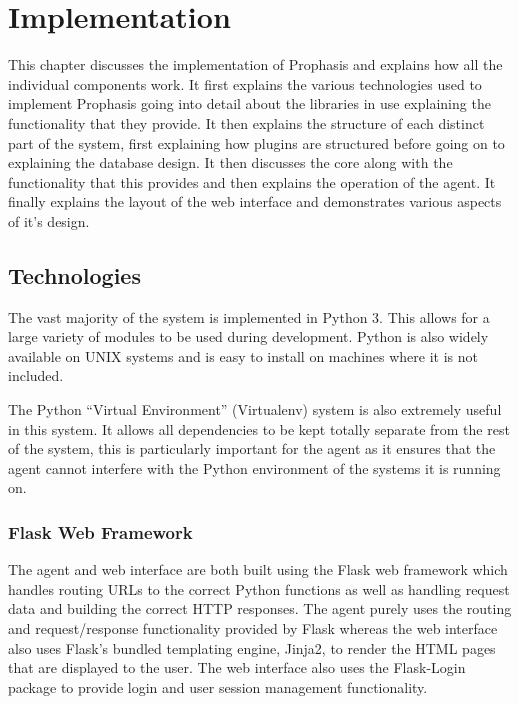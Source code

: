 \documentclass[bsc,logo,twoside,parskip,singlespacing,notimes]{infthesis}
\begin{document}
\chapter{Implementation}
	This chapter discusses the implementation of Prophasis and explains how all the
	individual components work.  It first explains the various technologies used to
	implement Prophasis going into detail about the libraries in use explaining
	the functionality that they provide.  It then explains the structure of each
	distinct part of the system, first explaining how plugins are structured before
	going on to explaining the database design.  It then discusses the core along
	with the functionality that this provides and then explains the operation of
	the agent. It finally explains the layout of the web interface and demonstrates
	various aspects of it's design.

\section{Technologies}

	The vast majority of the system is implemented in Python 3.  This allows for a
	large variety of modules to be used during development. Python is also widely
	available on UNIX systems and is easy to install on machines where it is not
	included.


	The Python ``Virtual Environment'' (Virtualenv) system is also extremely useful
	in this system.  It allows all dependencies to be kept totally separate from
	the rest of the system, this is particularly important for the agent as it
	ensures that the agent cannot interfere with the Python environment of the
	systems it is running on.

\subsection{Flask Web Framework}

	The agent and web interface are both built using the Flask web framework which
	handles routing URLs to the correct Python functions as well as handling
	request data and building the correct HTTP responses. The agent purely uses the
	routing and request/response functionality provided by Flask whereas the web
	interface also uses Flask's bundled templating engine, Jinja2, to render the
	HTML pages that are displayed to the user. The web interface also uses the
	Flask-Login package to provide login and user session management functionality.
\end{document}
